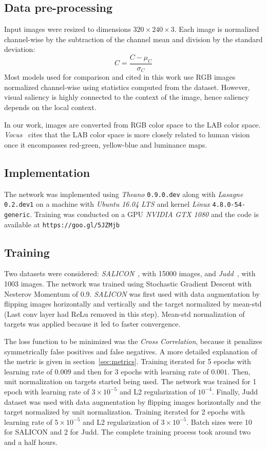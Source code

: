 \documentclass[10pt,twocolumn,letterpaper]{article}
\begin{document}
\subsection{Data pre-processing}
Input images were resized to dimensions $320\times240\times3$.
Each image is normalized channel-wise by the subtraction of
the channel mean and division by the standard deviation:
$$C = \frac{C - \mu_C}{\sigma_C}$$
Most models used for comparison and cited in this work use RGB images
normalized channel-wise using statistics computed from the dataset.
However, visual saliency is highly connected to the context of the
image, hence saliency depends on the local context.

In our work, images are converted from RGB color space to the LAB color
space.
\emph{Vocus}~\cite{frintrop_2005} cites that the
LAB color space is more closely related to human vision once it encompasses
red-green, yellow-blue and
luminance maps.

\subsection{Implementation}
The network was implemented using \emph{Theano} \texttt{0.9.0.dev}
along with \emph{Lasagne} \texttt{0.2.dev1}
on a machine with \emph{Ubuntu 16.04 LTS} and
kernel \emph{Linux} \texttt{4.8.0-54-generic}.
Training was conducted on a GPU \emph{NVIDIA GTX 1080} and the
code is available at \texttt{https://goo.gl/5JZMjb}

\subsection{Training}
Two datasets were considered:
\emph{SALICON}~\cite{jiang_2015}, with 15000 images, and
\emph{Judd}~\cite{judd}, with 1003 images.
The network was trained using Stochastic Gradient Descent with Nesterov
Momentum of $0.9$.
\emph{SALICON} was first used with data augmentation by flipping images
horizontally and vertically and the target normalized by mean-std
(Last conv layer had ReLu removed in this step).
Mean-std normalization of targets was applied because it led to faster
convergence.

The loss function to be minimized was the \emph{Cross Correlation},
because it penalizes symmetrically false positives and false negatives.
A more detailed explanation of the metric is given in
section~\ref{sec:metrics}.
Training iterated for 5 epochs with learning rate of $0.009$
and then for 3 epochs with learning rate of $0.001$.
Then, unit normalization on targets started being used.
The network was trained for 1 epoch with learning rate of
$3\times10^{-5}$ and L2 regularization of $10^{-4}$. Finally, Judd dataset was used with data augmentation by flipping images horizontally and the target normalized by unit normalization.
Training iterated for 2 epochs with learning rate of
$5\times10^{-5}$ and L2 regularization of $3\times10^{-5}$. Batch sizes were 10 for SALICON and 2 for Judd. The complete training process took around two and a half hours.
\end{document}
